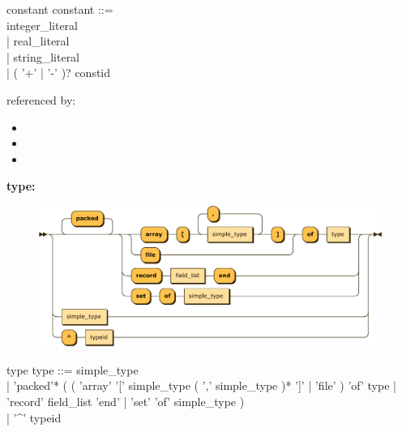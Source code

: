 \documentclass[10pt,a4paper,twoside]{article}
\providecommand{\tightlist}{%
  \setlength{\itemsep}{0pt}\setlength{\parskip}{0pt}}
\newcounter{grammarbox}[section]
\begin{document}
\begin{grammarbox}{constant}
\ttfamily
\vspace*{0.5em}
constant ::= \\
    integer\_literal \\
  \hspace*{1.5em} | real\_literal \\
  \hspace*{1.5em} | string\_literal \\
  \hspace*{1.5em} | ( '+' | '-' )? constid
\end{grammarbox}

referenced by:

\begin{itemize}
\tightlist
\item
\item
\item
\end{itemize}

\textbf{type:}

\begin{figure}[H]
\centering
  \includegraphics[width=1\textwidth]{diagram/type.pdf}

\end{figure}

\begin{grammarbox}{type}
\ttfamily
  \vspace*{0.5em}
type ::= simple\_type \\
\hspace*{1.5em} | 'packed'* ( ( 'array' '[' simple\_type ( ',' simple\_type )* ']' | 'file' ) 'of' type | 'record' field\_list 'end' | 'set' 'of' simple\_type ) \\
\hspace*{1.5em} | '\^{}' typeid
\end{grammarbox}
\end{document}
